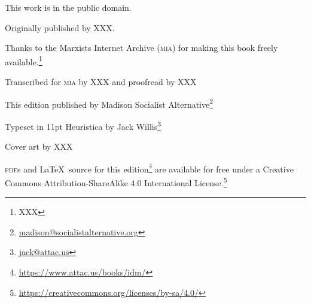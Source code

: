 {
	\setlength{\parindent}{0em}
	\setlength{\parskip}{0.5em}
	\sloppy
	\thispagestyle{empty}
	
	\vspace*{\fill}
	
	This work is in the public domain.
	
	Originally published by XXX.
	
	Thanks to the Marxists Internet Archive (\textsc{mia})
	for making this book freely available.\footnote{XXX}
	
	Transcribed for \textsc{mia} by XXX and proofread by XXX
	
	This edition published by Madison Socialist Alternative\footnote{\href{mailto:madison@socialistalternative.org}{madison@socialistalternative.org}}
	
	Typeset in 11pt Heuristica by Jack Willis\footnote{\href{mailto:jack@attac.us}{jack@attac.us}}
	
	Cover art by XXX
	
	\textsc{pdf}s and \LaTeX\ source for this edition\footnote{\href{https://www.attac.us/books/idm/}{https://www.attac.us/books/idm/}} are available for free under a Creative Commons Attribution-Share\-Alike 4.0 International License.\footnote{\href{https://creativecommons.org/licenses/by-sa/4.0/}{https://creativecommons.org/licenses/by-sa/4.0/}}
	
	\vspace*{\fill}
	
	\vspace*{\fill}
}